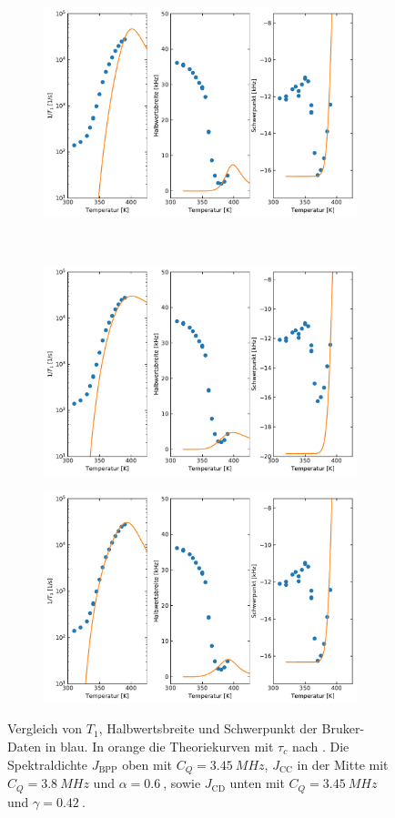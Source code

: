 \begin{figure}
	\centering
	\begin{subfigure}{\textwidth}
		\centering
		\includegraphics[width=.7\textwidth]{graphics/plot/Bruker_J_01.pdf}
	\end{subfigure} \\
	\begin{subfigure}{\textwidth}
		\centering
		\includegraphics[width=.7\textwidth]{graphics/plot/Bruker_J_cc_02.pdf}
	\end{subfigure}
	\begin{subfigure}{\textwidth}
		\centering
		\includegraphics[width=.7\textwidth]{graphics/plot/Bruker_J_dc_01.pdf}
	\end{subfigure}
	\caption{Vergleich von $T_1$, Halbwertsbreite und Schwerpunkt der Bruker-Daten in blau. In orange die Theoriekurven mit $\tau_c$ nach \cite{PIMENOV199793}. Die Spektraldichte $J_\text{BPP}$ oben mit $C_Q = \SI{3.45}{MHz}$, $J_\text{CC}$ in der Mitte mit $C_Q = \SI{3.8}{MHz}$ und $\alpha = \SI{0.6}{}$, sowie $J_\text{CD}$ unten mit $C_Q = \SI{3.45}{MHz}$ und $\gamma = \SI{0.42}{}$.}
	\label{fig:res:theorie_j_bruker}
\end{figure}


